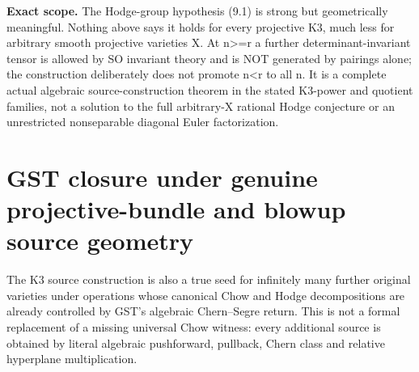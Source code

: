 \documentclass[11pt]{article}
\begin{document}
\noindent\textbf{Exact scope.}
The Hodge-group hypothesis (9.1) is
strong but geometrically meaningful.
Nothing above says it holds for
every projective K3, much less
for arbitrary smooth projective
varieties X. At n>=r a further
determinant-invariant tensor is
allowed by SO invariant theory
and is NOT generated by pairings
alone; the construction deliberately
does not promote n<r to all n.
It is a complete actual algebraic
source-construction theorem in
the stated K3-power and quotient
families, not a solution to the
full arbitrary-X rational Hodge
conjecture or an unrestricted
nonseparable diagonal Euler
factorization.

\section{GST closure under genuine projective-bundle and blowup source geometry}
The K3 source construction is also a true
seed for infinitely many further original
varieties under operations whose canonical
Chow and Hodge decompositions are already
controlled by GST's algebraic Chern--Segre
return. This is not a formal replacement of
a missing universal Chow witness: every
additional source is obtained by literal
algebraic pushforward, pullback, Chern
class and relative hyperplane multiplication.
\end{document}

